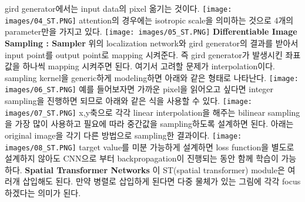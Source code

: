 \documentclass[extendedabs]{bmvc2k}
\begin{document}
 gird generator에서는 input data의 pixel 옮기는 것이다. 
 \newline  \texttt{[image: images/04\_ST.PNG]}
 \newline attention의 경우에는 isotropic scale을 의미하는 것으로 4개의 parameter만을 가지고 있다. \cite{youtube}
 \newline  \texttt{[image: images/05\_ST.PNG]}
 \newline \textbf{Differentiable Image Sampling : Sampler} 위의 localization network와 gird generator의 결과를 받아서 input point를 output point로 mapping 시켜준다.
 즉 gird generator가 발생시킨 좌표값을 하나씩 mapping 시켜주면 된다. 여기서 고려할 문제가 interpolation이다. sampling kernel을 generic하게 modeling하면 아래와 같은 형태로 나타난다.
 \newline  \texttt{[image: images/06\_ST.PNG]}
 예를 들어보자면 가까운 pixel을 읽어오고 싶다면 integer sampling을 진행하면 되므로 아래와 같은 식을 사용할 수 있다.
 \newline  \texttt{[image: images/07\_ST.PNG]}
 \newline x,y축으로 각각 linear interpolation을 해주는 bilinear sampling을 가장 많이 사용하고 필요에 따라 중간값을 sampling하도록 설계하면 된다. 
 아래는 original image을 각기 다른 방법으로 sampling한 결과이다. 
 \newline  \texttt{[image: images/08\_ST.PNG]}
 \newline  target value를 미분 가능하게 설계하면 loss function을 별도로 설계하지 않아도 CNN으로 부터 backpropagation이 진행되는 동안 함께 학습이 가능하다.
 \newline \textbf{Spatial Transformer Networks} 이 ST(spatial transformer) module은 여러개 삽입해도 된다. 만약 병렬로 삽입하게 된다면 다중 물체가 있는 그림에 각각 focus하겠다는 의미가 된다.
 
\end{document}
